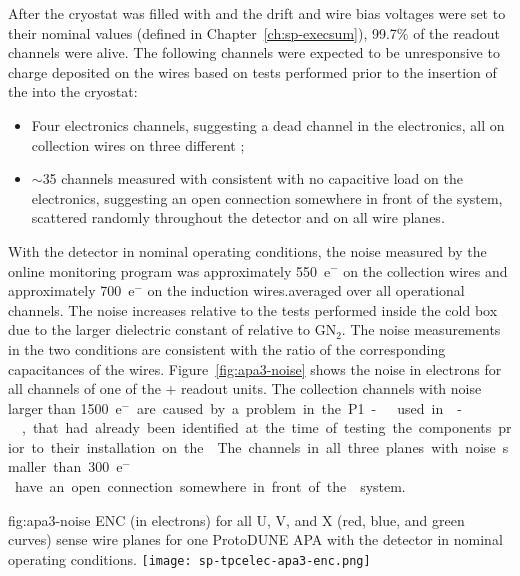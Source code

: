 After the cryostat was filled with  and the drift and wire 
bias voltages were set to their nominal values (defined in Chapter~\ref{ch:sp-execsum}), 
99.7\% of the  readout channels were alive. The following 
channels were expected to be unresponsive to charge deposited on the wires
based on tests performed prior to the insertion of the  into
the cryostat:
\begin{itemize}
\item{Four electronics channels, suggesting a dead channel in the electronics, 
all on collection wires on three different ;}
\item{$\sim$35 channels measured with consistent with no capacitive load 
on the  electronics, suggesting an open connection somewhere in 
front of the  system, scattered randomly throughout the detector 
and on all wire planes.}
\end{itemize}
With the detector in nominal operating conditions, the noise
measured by the online monitoring program was approximately 550~e$^-$ 
on the collection wires and approximately 700~e$^-$ on the induction
wires.averaged over all operational channels. The noise increases
relative to the tests performed inside the cold box due to the 
larger dielectric constant of \lntwo relative to GN$_2$. The noise
measurements in the two conditions are consistent with the 
ratio of the corresponding capacitances of the  wires.
Figure~\ref{fig:apa3-noise} 
shows the noise in electrons for all channels of one of the 
+ readout units. The collection channels with 
noise larger than \SI{1500}{e$^-$} are caused by a problem in the P1-
 used in -, that had already
been identified at the time of testing the components prior to their
installation on the . The channels in all three planes 
with noise smaller than \SI{300}{e$^-$} have an open connection somewhere in 
front of the  system.

\begin{dunefigure}
{fig:apa3-noise}
{ENC (in electrons) for all U, V, and X (red, blue, and green curves) sense 
wire planes for one ProtoDUNE APA with the detector in nominal operating 
conditions.}
\texttt{[image: sp-tpcelec-apa3-enc.png]}
\end{dunefigure}

